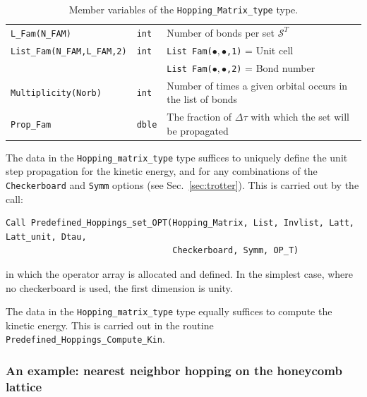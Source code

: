 \begin{table}[h]
\begin{center}
\begin{tabular}{@{} p{} @{} p{} p{} @{}}
			\texttt{L\_Fam(N\_FAM)}  & \texttt{int}    & Number of bonds per set $\mathcal{S}^{T}$ \\    
			\texttt{List\_Fam(N\_FAM,L\_FAM,2)}& \texttt{int} & \texttt{List Fam($ \bullet,\bullet $,1)} =  Unit cell \\
			&                        &          \texttt{List Fam($\bullet,\bullet$,2)} =   Bond number \\
			\texttt{Multiplicity(Norb)}& \texttt{int}  & Number of  times a  given orbital  occurs in the list of bonds  \\
			\texttt{Prop\_Fam} & \texttt{dble}         & The fraction of $\Delta \tau$ with which the set will be propagated   \                                
			\\\bottomrule
		\end{tabular}
		\caption{Member variables of the \texttt{Hopping\_Matrix\_type}  type.   
			\label{table:Hopping_matrix}}
	\end{center}
\end{table}

The  data in the \texttt{Hopping\_matrix\_type} type suffices to uniquely define the  unit step propagation for the kinetic energy, and for  any combinations of the  \texttt{Checkerboard} and  \texttt{Symm}  options (see Sec.~\ref{sec:trotter}).
This is carried out by the call: 
\begin{lstlisting}[style=fortran]
Call Predefined_Hoppings_set_OPT(Hopping_Matrix, List, Invlist, Latt, Latt_unit, Dtau,
                                 Checkerboard, Symm, OP_T)
\end{lstlisting}
in which  the  operator   array     is  allocated and defined.    In the simplest  case, where no  checkerboard is  used, the  first dimension  is  unity.


The   data in  the \texttt{Hopping\_matrix\_type} type   equally  suffices to compute  the kinetic energy.  This is carried out in the routine \texttt{Predefined\_Hoppings\_Compute\_Kin}.

\subsubsection{An example:   nearest neighbor hopping on the   honeycomb lattice }

